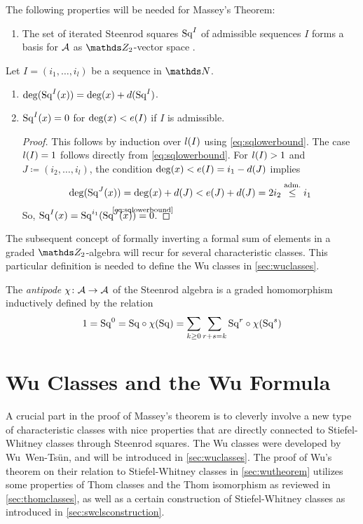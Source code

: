 \begin{Rem}\label{rem:sq}
  The following properties will be needed for Massey's Theorem:
  \begin{enumerate}
  \item The set of iterated Steenrod squares $\mathrm{Sq}^{I}$ of admissible
    sequences $I$ forms a basis for $\mathcal{A}$ as $\Zmod2$-vector space
    \cite[Chap.~6, Theorem~1]{mosher}.
  \end{enumerate}
  Let $I=(i_1,\dotsc,i_l)$ be a sequence in $\Nat$.
  \begin{enumerate}[resume]
  \item $\deg(\mathrm{Sq}^{I}(x)) = \deg(x) + d(\mathrm{Sq}^{I})$.
  \item\label{item:squpperboundgeneral} $\mathrm{Sq}^{I}(x) = 0$ for  $\deg(x)<e(I)$ if $I$ is admissible.
    \begin{proof}
      This follows by induction over $l(I)$ using
      \eqref{eq:sqlowerbound}. The case $l(I)=1$ follows directly 
      from \eqref{eq:sqlowerbound}.
      For $l(I)>1$ and $J\coloneqq(i_2,\dotsc,i_l)$, the condition
      $\deg(x) < e(I)=i_1-d(J)$
      implies
      \begin{gather*}
        \deg(\mathrm{Sq}^{J}(x))
        = \deg(x)+d(J) < e(J)+d(J) = 2i_2
        \overset{\text{adm.}}\leq i_1
      \end{gather*}
      So,
      $\Sq I(x)=\Sq{i_1}(\Sq J(x)) \cequalsby{\eqref{eq:sqlowerbound}} 0$.
    \end{proof}
  \end{enumerate}
\end{Rem}

The subsequent concept of formally inverting a formal sum of elements
in a graded $\Zmod2$-algebra will recur for several characteristic
classes. This particular definition is needed to define the Wu classes
in \autoref{sec:wuclasses}. 
\begin{Def}\label{def:antipode}
  The \emph{antipode} $\chi\colon \mathcal{A}\to\mathcal{A}$ of the Steenrod algebra is a
  graded homomorphism inductively defined by the relation
  \begin{gather*}
    1 = \mathrm{Sq}^{0}
    = \mathrm{Sq} \circ \chi(\mathrm{Sq})
    = \sum_{k\geq0}\sum_{r+s=k} \mathrm{Sq}^{r} \circ \chi(\mathrm{Sq}^{s})
  \end{gather*}
\end{Def}

\section{Wu Classes and the Wu Formula}\label{sec:wuclassesmain}
A crucial part in the proof of Massey's theorem is to cleverly involve
a new type of characteristic classes with nice properties that are
directly connected to Stiefel-Whitney classes through Steenrod
squares.
The Wu classes were developed by Wu~Wen-Tsün, and will be introduced in
\autoref{sec:wuclasses}.
The proof of Wu's theorem on their relation to Stiefel-Whitney
classes in \autoref{sec:wutheorem} utilizes some properties of Thom
classes and the Thom isomorphism as reviewed in
\autoref{sec:thomclasses}, as well as a certain construction of
Stiefel-Whitney classes as introduced in
\autoref{sec:swclsconstruction}.


